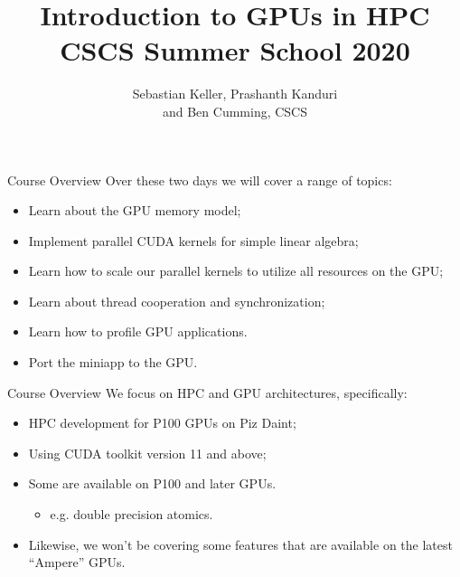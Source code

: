 \documentclass[aspectratio=43]{beamer}
\author{Sebastian Keller, Prashanth Kanduri\\ and Ben Cumming, CSCS}
\title{Introduction to GPUs in HPC\\CSCS Summer School 2020}
\subtitle{}
\begin{document}
\cscstitle


\begin{frame}[fragile]{Course Overview}
    Over these two days we will cover a range of topics:
    \begin{itemize}
        \item Learn about the GPU memory model;
        \item Implement parallel CUDA kernels for simple linear algebra;
        \item Learn how to scale our parallel kernels to utilize all resources on the GPU;
        \item Learn about thread cooperation and synchronization;
        \item Learn how to profile GPU applications.
        \item Port the miniapp to the GPU.
    \end{itemize}
\end{frame}

\begin{frame}[fragile]{Course Overview}
    We focus on HPC and GPU architectures, specifically:
    \begin{itemize}
        \item HPC development for P100 GPUs on Piz Daint;
        \item Using CUDA toolkit version 11 and above;
        \item Some are available on P100 and later GPUs.
        \begin{itemize}
            \item  e.g. double precision atomics.
        \end{itemize}
        \item Likewise, we won't be covering some features that are available on the latest ``Ampere'' GPUs.
    \end{itemize}
\end{frame}
\end{document}
